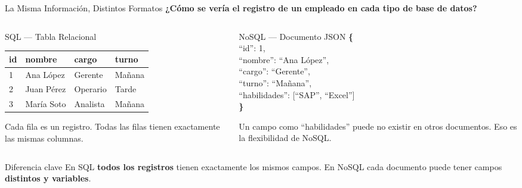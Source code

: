 \documentclass[aspectratio=169]{beamer}
\begin{document}
\begin{frame}{La Misma Información, Distintos Formatos}
  \small
  \centering\textbf{¿Cómo se vería el registro de un empleado en cada tipo de base de datos?}
  \vspace{0.1cm}
  \begin{columns}[T]
    \begin{column}{0.50\textwidth}
      \begin{conceptbox}{\faTable\enspace SQL --- Tabla Relacional}
        \centering
        \vspace{4pt}
        {\tiny
        \begin{tabular}{|l|l|l|l|}
          \hline
          \textbf{id} & \textbf{nombre} & \textbf{cargo} & \textbf{turno} \\
          \hline
          1 & Ana López & Gerente & Mañana \\
          2 & Juan Pérez & Operario & Tarde \\
          3 & María Soto & Analista & Mañana \\
          \hline
        \end{tabular}
        }
        \vspace{4pt}
        \par\tiny Cada fila es un registro. Todas las filas tienen exactamente las mismas columnas.
      \end{conceptbox}
    \end{column}
    \begin{column}{0.47\textwidth}
      \begin{alertblock}{\faCode\enspace NoSQL --- Documento JSON}
        {\footnotesize\ttfamily\selectfont
          \textbf{\{}\\
          \quad ``id'': 1,\\
          \quad ``nombre'': ``Ana López'',\\
          \quad ``cargo'': ``Gerente'',\\
          \quad ``turno'': ``Mañana'',\\
          \quad ``habilidades'': [``SAP'', ``Excel'']\\
          \textbf{\}}
        }
      \end{alertblock}
      \tiny Un campo como ``habilidades'' puede no existir en otros documentos. Eso es la flexibilidad de NoSQL.
    \end{column}
  \end{columns}
  \vspace{0.1cm}
  \begin{conceptbox}{\faArrowRight\enspace Diferencia clave}
    \small
    En SQL \textbf{todos los registros} tienen exactamente los mismos campos. En NoSQL cada documento puede tener campos \textbf{distintos y variables}.
  \end{conceptbox}
\end{frame}
\end{document}
